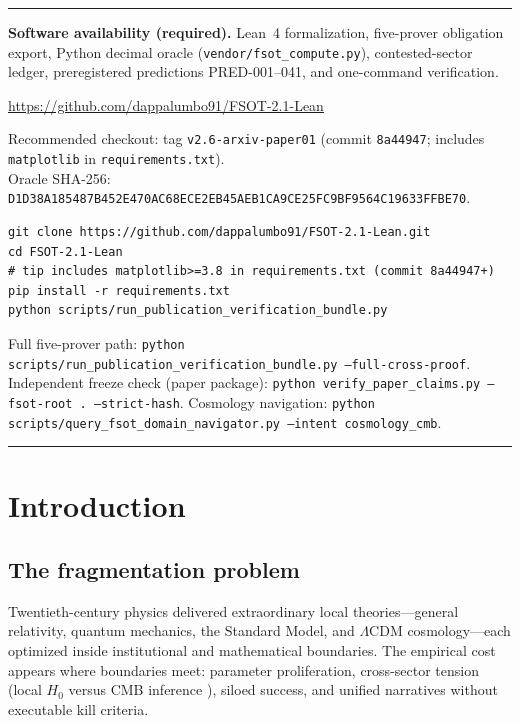 \documentclass[11pt,a4paper]{article}
\begin{document}
\vspace{0.8em}
\noindent
\begin{center}
\begin{minipage}{0.95\linewidth}
\hrule\vspace{0.5em}
{\small
\textbf{Software availability (required).}
Lean~4 formalization, five-prover obligation export, Python decimal oracle
(\texttt{vendor/fsot\_compute.py}), contested-sector ledger, preregistered
predictions PRED-001--041, and one-command verification.

\centering
\url{https://github.com/dappalumbo91/FSOT-2.1-Lean}

\smallskip
Recommended checkout: tag \texttt{v2.6-arxiv-paper01} (commit \texttt{8a44947};
includes \texttt{matplotlib} in \texttt{requirements.txt}).\\
Oracle SHA-256:
\texttt{D1D38A185487B452E470AC68ECE2EB45AEB1CA9CE25FC9BF9564C19633FFBE70}.

\begin{verbatim}
git clone https://github.com/dappalumbo91/FSOT-2.1-Lean.git
cd FSOT-2.1-Lean
# tip includes matplotlib>=3.8 in requirements.txt (commit 8a44947+)
pip install -r requirements.txt
python scripts/run_publication_verification_bundle.py
\end{verbatim}

\noindent Full five-prover path:
\texttt{python scripts/run\_publication\_verification\_bundle.py --full-cross-proof}.
Independent freeze check (paper package):
\texttt{python verify\_paper\_claims.py --fsot-root . --strict-hash}.
Cosmology navigation:
\texttt{python scripts/query\_fsot\_domain\_navigator.py --intent cosmology\_cmb}.
}
\vspace{0.5em}\hrule
\end{minipage}
\end{center}

\section{Introduction}
\label{sec:intro}

\subsection{The fragmentation problem}

Twentieth-century physics delivered extraordinary local theories---general
relativity, quantum mechanics, the Standard Model, and $\Lambda$CDM
cosmology---each optimized inside institutional and mathematical boundaries.
The empirical cost appears where boundaries meet: parameter proliferation,
cross-sector tension (local $H_0$ versus CMB inference
\cite{Planck2018,Riess2022,Riess2024}), siloed success, and unified narratives
without executable kill criteria.
\end{document}
